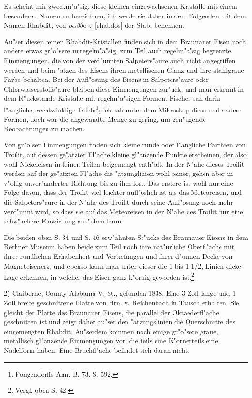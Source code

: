 \documentclass[a4paper, 11pt, oneside, german]{article}
\begin{document}
Es scheint mir zweckm"a"sig, diese kleinen eingewachsenen Kristalle mit einem besonderen Namen zu bezeichnen, ich werde sie daher in dem Folgenden mit dem Namen Rhabdit, von $\rho\alpha\beta\delta$o$\varsigma$ [rhabdos] der Stab, benennen.

Au"ser diesen feinen Rhabdit-Kristallen finden sich in dem Braunauer Eisen noch andere etwas gr"o"sere unregelm"a"sig, zum Teil auch regelm"a"sig begrenzte Einmengungen, die von der verd"unnten Salpeters"aure auch nicht angegriffen werden und beim "atzen des Eisens ihren metallischen Glanz und ihre stahlgraue Farbe behalten. Bei der Aufl"osung des Eisens in Salpeters"aure oder Chlorwasserstoffs"aure bleiben diese Einmengungen zur"uck, und man erkennt in dem R"uckstande Kristalle mit regelm"a"sigen Formen. Fischer sah darin l"angliche, rechtwinklige Tafeln\footnote{Pongendorffs Ann. B. 73. S. 592.}; ich sah unter dem Mikroskop diese und andere Formen, doch war die angewandte Menge zu gering, um gen"ugende Beobachtungen zu machen.

Von gr"o"ser Einmengungen finden sich kleine runde oder l"angliche Parthien von Troilit, auf dessen ge"atzter Fl"ache kleine gl"anzende Punkte erscheinen, der also wohl Nickeleisen in feinen Teilen beigemengt enth"alt. In der N"ahe dieses Troilit werden auf der ge"atzten Fl"ache die "atzunglinien wohl feiner, gehen aber in v"ollig unver"anderter Richtung bis zu ihm fort. Das erstere ist wohl nur eine Folge davon, dass der Troilit viel leichter aufl"oslich ist als das Meteoreisen, und die Salpeters"aure in der N"ahe des Troilit durch seine Aufl"osung noch mehr verd"unnt wird, so dass sie auf das Meteoreisen in der N"ahe des Troilit nur eine schw"achere Einwirkung aus"uben kann.

Die beiden oben S. 34 und S. 46 erw"ahnten St"ucke des Braunauer Eisens in dem Berliner Museum haben beide zum Teil noch ihre nat"urliche Oberfl"ache mit ihrer rundlichen Erhabenheit und Vertiefungen und ihrer d"unnen Decke von Magneteisenerz, und ebenso kann man unter dieser die 1 bis 1 1/2, Linien dicke Lage erkennen, in welcher das Eisen ganz k"ornig geworden ist.\footnote{Vergl. oben S. 42.}

2) Claiborne, County Alabama V. St., gefunden 1838. Eine 3 Zoll lange und 1 Zoll breite geschnittene Platte von Hrn. v. Reichenbach in Tausch erhalten. Sie gleicht der Platte des Braunauer Eisens, die parallel der Oktaederfl"ache geschnitten ist und zeigt daher au"ser den "atzungslinien die Querschnitte des eingemengten Rhabdit. Au"serdem kommen noch einige gr"o"sere graue, metallisch gl"anzende Einmengungen vor, die teils eine K"ornerteils eine Nadelform haben. Eine Bruchfl"ache befindet sich daran nicht.
\end{document}
